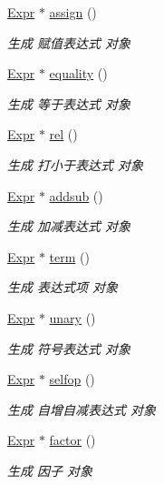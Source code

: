 \begin{DoxyCompactItemize}
\hyperlink{class_expr}{Expr} $\ast$ \hyperlink{class_parser_a24a9ce00f5db17f1e2b2019d6791a7e3}{assign} ()
\begin{DoxyCompactList}\small\item\em 生成 赋值表达式 对象 \end{DoxyCompactList}\item 
\hyperlink{class_expr}{Expr} $\ast$ \hyperlink{class_parser_acf81bd28478a78855da7271b0dd7a09d}{equality} ()
\begin{DoxyCompactList}\small\item\em 生成 等于表达式 对象 \end{DoxyCompactList}\item 
\hyperlink{class_expr}{Expr} $\ast$ \hyperlink{class_parser_a8ca8a4997cc230fb127ddb34986e9ffd}{rel} ()
\begin{DoxyCompactList}\small\item\em 生成 打小于表达式 对象 \end{DoxyCompactList}\item 
\hyperlink{class_expr}{Expr} $\ast$ \hyperlink{class_parser_a198213e9e10727dab4b6f54ee781958b}{addsub} ()
\begin{DoxyCompactList}\small\item\em 生成 加减表达式 对象 \end{DoxyCompactList}\item 
\hyperlink{class_expr}{Expr} $\ast$ \hyperlink{class_parser_a3809fe1d71ccaf111e4c6dc57f86640f}{term} ()
\begin{DoxyCompactList}\small\item\em 生成 表达式项 对象 \end{DoxyCompactList}\item 
\hyperlink{class_expr}{Expr} $\ast$ \hyperlink{class_parser_ac58cd88a976f4a7d147f5f815724f6a6}{unary} ()
\begin{DoxyCompactList}\small\item\em 生成 符号表达式 对象 \end{DoxyCompactList}\item 
\hyperlink{class_expr}{Expr} $\ast$ \hyperlink{class_parser_a3d5348cd92711fd39aea2b959e029e99}{selfop} ()
\begin{DoxyCompactList}\small\item\em 生成 自增自减表达式 对象 \end{DoxyCompactList}\item 
\hyperlink{class_expr}{Expr} $\ast$ \hyperlink{class_parser_ac85a997e91604de1d3505b3c8aaddf3b}{factor} ()
\begin{DoxyCompactList}\small\item\em 生成 因子 对象 \end{DoxyCompactList}\end{DoxyCompactItemize}
